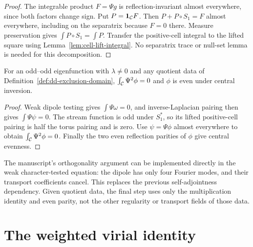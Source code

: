 \begin{proof}
\leanok
The integrable product $F=\Psi g$ is reflection-invariant almost everywhere,
since both factors change sign. Put $P=\mathbf1_{\mathcal{C}}F$.
Then $P+P\circ S_1=F$ almost everywhere, including on the separatrix
because $F=0$ there. Measure preservation gives $\int P\circ S_1=\int P$.
Transfer the positive-cell integral to the lifted square using
Lemma~\ref{lem:cell-lift-integral}. No separatrix trace or null-set lemma is
needed for this decomposition.
\end{proof}

\begin{lemma}
\label{lem:dd-orthogonality}
\leanok
For an odd--odd eigenfunction with $\lambda\ne0$ and any quotient data of
Definition~\ref{def:dd-exclusion-domain}, $\int_{\mathcal{C}}\Psi^2\phi=0$ and
$\phi$ is even under central inversion.
\end{lemma}

\begin{proof}
\leanok
Weak dipole testing gives $\int\Psi\omega=0$, and inverse-Laplacian pairing
then gives $\int\Psi\psi=0$. The stream function is odd under $S_1^*$,
so its lifted positive-cell pairing is half the torus pairing and is zero.
Use $\psi=\Psi\phi$ almost everywhere to obtain $\int_{\mathcal{C}}\Psi^2\phi=0$.
Finally the two even reflection parities of $\phi$ give central evenness.
\end{proof}

\begin{remark}
The manuscript's orthogonality argument can be implemented directly in the
weak character-tested equation: the dipole has only four Fourier modes,
and their transport coefficients cancel. This replaces the previous
self-adjointness dependency. Given quotient data, the final step uses only
the multiplication identity and even parity, not the other regularity or
transport fields of those data.
\end{remark}

\section{The weighted virial identity}

